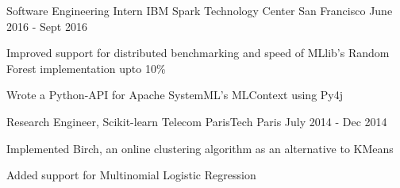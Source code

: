 \begin{cventries}
  \cventry
    {Software Engineering Intern}
    {IBM Spark Technology Center}
    {San Francisco}
    {June 2016 - Sept 2016}
    {
      \begin{cvitems}
        \item {Improved support for distributed benchmarking and speed of MLlib's Random Forest implementation upto 10\%}
        \item {Wrote a Python-API for Apache SystemML's MLContext using Py4j}
      \end{cvitems}
   }

   \cventry
    {Research Engineer, Scikit-learn}
    {Telecom ParisTech}
    {Paris}
    {July 2014 - Dec 2014}
    {
      \begin{cvitems}
        \item {Implemented Birch, an online clustering algorithm as an alternative to KMeans}
        \item {Added support for Multinomial Logistic Regression}
      \end{cvitems}
    }
\end{cventries}
